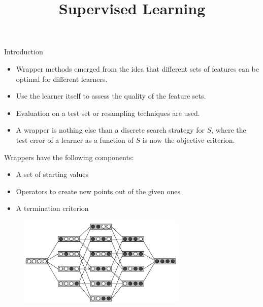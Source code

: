 \documentclass[11pt,compress,t,notes=noshow, xcolor=table]{beamer}
\title{Supervised Learning}
\date{}
\begin{document}

  \begin{vbframe}{Introduction}

    \begin{itemize}
      \item Wrapper methods emerged from the idea that different sets of features can be optimal for different learners.
      \item Use the learner itself to assess the quality of the feature sets.
      \item Evaluation on a test set or resampling techniques are used.
      \item A wrapper is nothing else than a discrete search strategy for $S$, where the test error of a learner as a function of $S$ is now the objective criterion.

    \end{itemize}


    \framebreak

    Wrappers have the following components:


    \begin{itemize}
      \item A set of starting values
      \item Operators to create new points out of the given ones
      \item A termination criterion
    \end{itemize}


    \begin{figure}
      \includegraphics[width=8cm]{figure_man/varsel_space.png}
    \end{figure}


  \end{vbframe}
\end{document}
